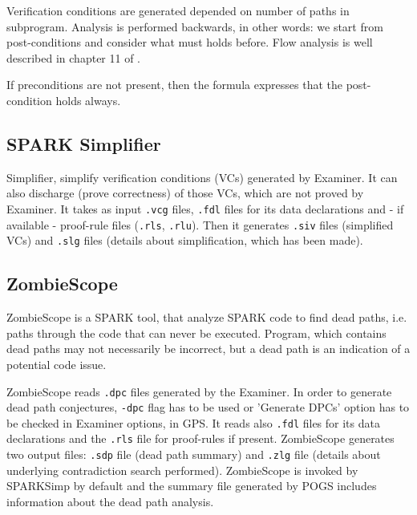 Verification conditions are generated depended on number of paths in subprogram. Analysis is performed backwards, in other words: we start from post-conditions and consider what must holds before. Flow analysis is well described in chapter 11 of \cite{Barnes:Book}.

If preconditions are not present, then the formula expresses that the post-condition holds always.



\subsection{SPARK Simplifier}
\label{verification:simplifier}

Simplifier, simplify verification conditions (VCs) generated by Examiner. It can also discharge (prove correctness) of those VCs, which are not proved by Examiner. \cite{Simplifier:Online} It takes as input \lstinline{.vcg} files, \lstinline{.fdl} files for its data declarations and - if available - proof-rule files (\lstinline{.rls}, \lstinline{.rlu}). Then it generates \lstinline{.siv} files (simplified VCs) and \lstinline{.slg} files (details about simplification, which has been made).



\subsection{ZombieScope}
\label{verification:zombiescope}

ZombieScope is a SPARK tool, that analyze SPARK code to find dead paths, i.e. paths through the code that can never be executed. Program, which contains dead paths may not necessarily be incorrect, but a dead path is an indication of a potential code issue.

ZombieScope reads \lstinline{.dpc} files generated by the Examiner. In order to generate dead path conjectures, \lstinline{-dpc} flag has to be used or 'Generate DPCs' option has to be checked in Examiner options, in GPS. It reads also \lstinline{.fdl} files for its data declarations and the \lstinline{.rls} file for proof-rules if present. ZombieScope generates two output files: \lstinline{.sdp} file (dead path summary) and \lstinline{.zlg} file (details about underlying contradiction search performed). ZombieScope is invoked by SPARKSimp by default and the summary file generated by POGS includes information about the dead path analysis.



